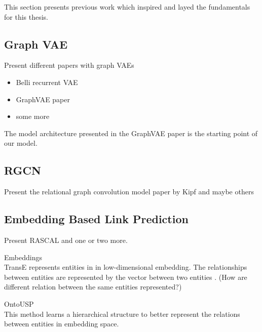 This section presents previous work which inspired and layed the fundamentals for this thesis.

\subsection{Graph VAE}

Present different papers with graph VAEs

\begin{itemize}
    \item Belli recurrent VAE
    \item GraphVAE paper
    \item some more
\end{itemize}

The model architecture presented in the GraphVAE paper is the starting point of our model.

\subsection{RGCN}

Present the relational graph convolution model paper by Kipf and maybe others

\subsection{Embedding Based Link Prediction}

Present RASCAL and one or two more.

\Graph Embeddings\\
TransE represents entities in in low-dimensional embedding. The relationships between entities are represented by the vector between two entities \cite{bordes_translating_2013}.
(How are different relation between the same entities represented?)

OntoUSP\\
This method learns a hierarchical structure to better represent the relations between entities in embedding space.
